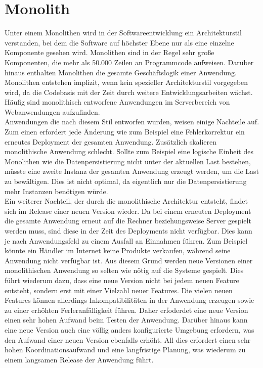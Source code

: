 \section{Monolith}
Unter einem Monolithen wird in der Softwareentwicklung ein Architekturstil verstanden, bei dem die Software auf höchster Ebene nur als eine einzelne Komponente gesehen wird. Monolithen sind in der Regel sehr große Komponenten, die mehr als 50.000 Zeilen an Programmcode aufweisen. Darüber hinaus enthalten Monolithen die gesamte Geschäftslogik einer Anwendung. Monolithen entstehen implizit, wenn kein spezieller Architekturstil vorgegeben wird, da die Codebasis mit der Zeit durch weitere Entwicklungsarbeiten wächst. Häufig sind monolithisch entworfene Anwendungen im Serverbereich von Webanwendungen aufzufinden. \\
Anwendungen die nach diesem Stil entworfen wurden, weisen einige Nachteile auf. Zum einen erfordert jede Änderung wie zum Beispiel eine Fehlerkorrektur ein erneutes Deployment der gesamten Anwendung. Zusätzlich skalieren monolithische Anwendung schlecht. Sollte zum Beispiel eine logische Einheit des Monolithen wie die Datenpersistierung nicht unter der aktuellen Last bestehen, müsste eine zweite Instanz der gesamten Anwendung erzeugt werden, um die Last zu bewältigen. Dies ist nicht optimal, da eigentlich nur die Datenpersistierung mehr Instanzen benötigen würde. \\
Ein weiterer Nachteil, der durch die monolithische Architektur entsteht, findet sich im Release einer neuen Version wieder. Da bei einem erneuten Deployment die gesamte Anwendung erneut auf die Rechner beziehungsweise Server gespielt werden muss, sind diese in der Zeit des Deployments nicht verfügbar. Dies kann je nach Anwendungsfeld zu einem Ausfall an Einnahmen führen. Zum Beispiel könnte ein Händler im Internet keine Produkte verkaufen, während seine Anwendung nicht verfügbar ist. Aus diesem Grund werden neue Versionen einer monolithischen Anwendung so selten wie nötig auf die Systeme gespielt. Dies führt wiederum dazu, dass eine neue Version nicht bei jedem neuen Feature entsteht, sondern erst mit einer Vielzahl neuer Features. Die vielen neuen Features können allerdings Inkompatibilitäten in der Anwendung erzeugen sowie zu einer erhöhten Ferleranfälligkeit führen. Daher erfoderdet eine neue Version einen sehr hohen Aufwand beim Testen der Anwendung. Darüber hinaus kann eine neue Version auch eine völlig anders konfigurierte Umgebung erfordern, was den Aufwand einer neuen Version ebenfalls erhöht. All dies erfordert einen sehr hohen Koordinationsaufwand und eine langfristige Planung, was wiederum zu einem langsamen Release der Anwendung führt.